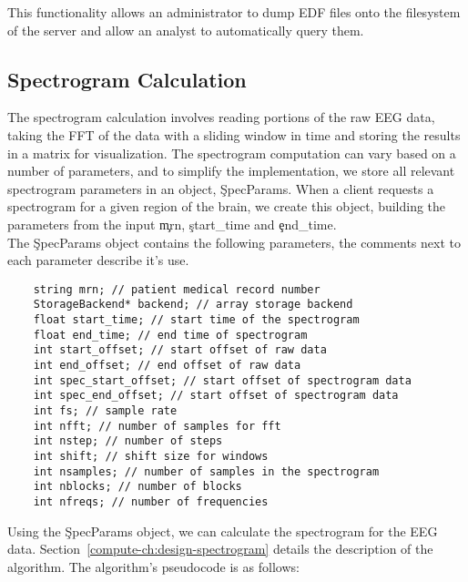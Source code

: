 This functionality allows an administrator to dump EDF files onto the
filesystem of the server and allow an analyst to automatically query them.

\subsection{Spectrogram Calculation}\label{compute-ch:implementation-spectrogram}

The spectrogram calculation involves reading portions of the raw EEG data,
taking the FFT of the data with a sliding window in time and storing the
results in a matrix for visualization. The spectrogram computation can vary
based on a number of parameters, and to simplify the implementation, we store
all relevant spectrogram parameters in an object, \c{SpecParams}. When a client
requests a spectrogram for a given region of the brain, we create this object,
building the parameters from the input \c{mrn}, \c{start\_time} and
\c{end\_time}. \\

The \c{SpecParams} object contains the following parameters, the comments next
to each parameter describe it's use.

\begin{lstlisting}
    string mrn; // patient medical record number
    StorageBackend* backend; // array storage backend
    float start_time; // start time of the spectrogram
    float end_time; // end time of spectrogram
    int start_offset; // start offset of raw data
    int end_offset; // end offset of raw data
    int spec_start_offset; // start offset of spectrogram data
    int spec_end_offset; // start offset of spectrogram data
    int fs; // sample rate
    int nfft; // number of samples for fft
    int nstep; // number of steps
    int shift; // shift size for windows
    int nsamples; // number of samples in the spectrogram
    int nblocks; // number of blocks
    int nfreqs; // number of frequencies
\end{lstlisting}

Using the \c{SpecParams} object, we can calculate the spectrogram for the EEG
data. Section~\ref{compute-ch:design-spectrogram} details the description of
the algorithm. The algorithm's pseudocode is as follows:

